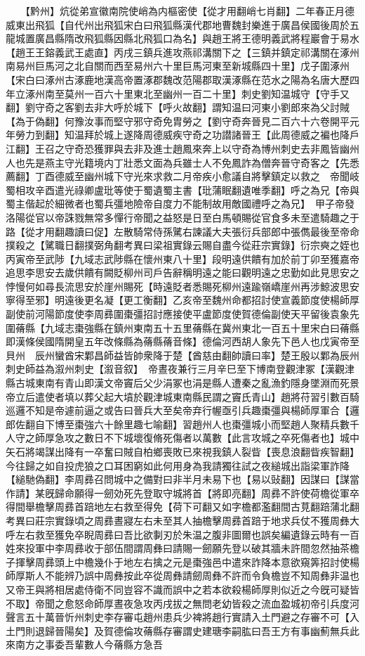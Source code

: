 　　【黔州】炕從弟宣徽南院使峭為内樞密使【從才用翻峭七肖翻】二年春正月德威東出飛狐【自代州出飛狐宋白曰飛狐縣漢代郡地曹魏封樂進于廣昌侯國後周於五龍城置廣昌縣隋改飛狐縣因縣北飛狐口為名】與趙王將王德明義武將程巖會于易水【趙王王鎔義武王處直】丙戌三鎮兵進攻燕祁溝關下之【三鎮并鎮定祁溝關在涿州南易州巨馬河之北自關而西至易州六十里巨馬河東至新城縣四十里】戊子圍涿州【宋白曰涿州古涿鹿地漢高帝置涿郡魏改范陽郡取漢涿縣在范水之陽為名唐大歷四年立涿州南至莫州一百六十里東北至幽州一百二十里】刺史劉知温城守【守手又翻】劉守奇之客劉去非大呼於城下【呼火故翻】謂知温曰河東小劉郎來為父討賊【為于偽翻】何豫汝事而堅守邪守奇免胄勞之【劉守奇奔晉見二百六十六卷開平元年勞力到翻】知温拜於城上遂降周德威疾守奇之功譛諸晉王【此周德威之褊也降戶江翻】王召之守奇恐獲罪與去非及進士趙鳳來奔上以守奇為博州刺史去非鳳皆幽州人也先是燕主守光籍境内丁壯悉文面為兵雖士人不免鳳詐為僧奔晉守奇客之【先悉薦翻】丁酉德威至幽州城下守光來求救二月帝疾小愈議自將擊鎮定以救之　帝聞岐蜀相攻辛酉遣光祿卿盧玭等使于蜀遺蜀主書【玭蒲眠翻遺唯季翻】呼之為兄【帝與蜀主偕起於細微者也蜀兵彊地險帝自度力不能制故用敵國禮呼之為兄】　甲子帝發洛陽從官以帝誅戮無常多憚行帝聞之益怒是日至白馬頓賜從官食多未至遣騎趣之于路【從才用翻趣讀曰促】左散騎常侍孫騭右諫議大夫張衍兵部郎中張儁最後至帝命撲殺之【騭職日翻撲弼角翻考異曰梁祖實錄云賜自盡今從莊宗實錄】衍宗奭之姪也丙寅帝至武陟【九域志武陟縣在懷州東八十里】段明遠供饋有加於前丁卯至獲嘉帝追思李思安去歲供饋有闕貶柳州司戶告辭稱明遠之能曰觀明遠之忠勤如此見思安之悖慢何如尋長流思安於崖州賜死【時遠貶者悉賜死柳州遠踰嶺嶠崖州再涉鯨波思安寧得至邪】明遠後更名凝【更工衡翻】乙亥帝至魏州命都招討使宣義節度使楊師厚副使前河陽節度使李周彞圍棗彊招討應接使平盧節度使賀德倫副使天平留後袁象先圍蓨縣【九域志棗強縣在鎮州東南五十五里蓨縣在冀州東北一百五十里宋白曰蓨縣即漢條侯國隋開皇五年改條縣為蓨縣蓨音條】德倫河西胡人象先下邑人也戊寅帝至貝州　辰州蠻酋宋鄴昌師益皆帥衆降于楚【酋慈由翻帥讀曰率】楚王殷以鄴為辰州刺史師益為溆州刺史【溆音叙】　帝晝夜兼行三月辛巳至下博南登觀津冢【漢觀津縣古城東南有青山即漢文帝竇后父少涓冢也涓是縣人遭秦之亂漁釣隱身墜淵而死景帝立后遣使者填以葬父起大墳於觀津城東南縣民謂之竇氏青山】趙將苻習引數百騎巡邏不知是帝遽前逼之或告曰晉兵大至矣帝弃行幄亟引兵趣棗彊與楊師厚軍合【邏郎佐翻自下博至棗強六十餘里趣七喻翻】習趙州人也棗彊城小而堅趙人聚精兵數千人守之師厚急攻之數日不下城壞復脩死傷者以萬數【此言攻城之卒死傷者也】城中矢石將竭謀出降有一卒奮曰賊自柏鄉喪敗已來視我鎮人裂眥【喪息浪翻眥疾智翻】今往歸之如自投虎狼之口耳困窮如此何用身為我請獨往試之夜縋城出詣梁軍詐降【縋馳偽翻】李周彞召問城中之備對曰非半月未易下也【易以䜴翻】因謀曰【謀當作請】某旣歸命願得一劒効死先登取守城將首【將即亮翻】周彞不許使荷檐從軍卒得間舉檐擊周彞首踣地左右救至得免【荷下可翻又如字檐都濫翻間古莧翻踣蒲北翻考異曰莊宗實錄頃之周彞晝寢左右未至其人抽檐擊周彞首踣于地求兵仗不獲周彝大呼左右救至獲免卒睨周彞曰吾比欲剚刃於朱温之腹非圖爾也誤矣編遺錄云時有一百姓來投軍中李周彞收于部伍間謂周彝曰請賜一劒願先登以破其牆未許間忽然抽茶檐子揮擊周彞頭上中檐幾仆于地左右擒之元是棗強邑中遣來詐降本意欲窺筭招討使楊師厚斯人不能辨乃誤中周彝按此卒從周彝請劒周彝不許而令負檐豈不知周彝非温也又帝王與將相居處侍衛不同豈容不識而誤中之若本欲殺楊師厚則似近之今旣可疑皆不取】帝聞之愈怒命師厚晝夜急攻丙戌拔之無問老幼皆殺之流血盈城初帝引兵度河聲言五十萬晉忻州刺史李存審屯趙州患兵少裨將趙行實請入土門避之存審不可【入土門則退歸晉陽矣】及賀德倫攻蓨縣存審謂史建瑭李嗣肱曰吾王方有事幽薊無兵此來南方之事委吾輩數人今蓨縣方急吾